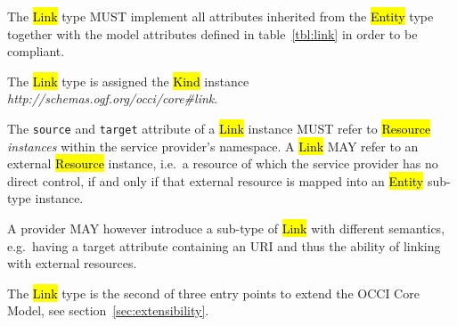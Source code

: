\documentclass[10pt,a4paper]{article}
\begin{document}
The \hl{Link} type MUST implement all attributes inherited from the
\hl{Entity} type together with the model attributes defined in
table~\ref{tbl:link} in order to be compliant.


The \hl{Link} type is assigned the \hl{Kind} instance
\textit{http://schemas.ogf.org/occi/core\#link}.


The {\tt source} and {\tt target} attribute of a \hl{Link} instance
MUST refer to \hl{Resource} {\em instances} within the service provider's
namespace. A \hl{Link} MAY refer to an external \hl{Resource} instance, i.e.~a
resource of which the service provider has no direct control, if and
only if that external resource is mapped into an \hl{Entity} sub-type
instance.

A provider MAY however introduce a sub-type of \hl{Link} with
different semantics, e.g.~having a target attribute containing an URI
and thus the ability of linking with external resources.

The \hl{Link} type is the second of three entry points to extend the
OCCI Core Model, see section~\ref{sec:extensibility}.
\end{document}
